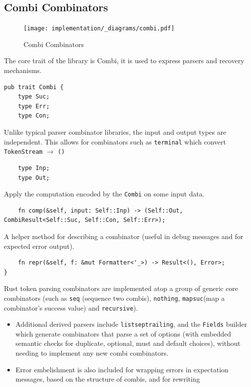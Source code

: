 \subsection{Combi Combinators}
\begin{figure}[h!]
    \centering
    \texttt{[image: implementation/\_diagrams/combi.pdf]}
    \caption{Combi Combinators}
\end{figure}
\noindent
The core trait of the library is Combi, it is used to express parsers and recovery mechanisms.
\begin{verbatim}
pub trait Combi {
    type Suc;
    type Err;
    type Con;
\end{verbatim}
Unlike typical parser combinator libraries, the input and output types are independent. This allows for combinators such as \texttt{terminal} which convert \texttt{TokenStream} $\to$ \texttt{()}
\begin{verbatim}
    type Inp;
    type Out;
\end{verbatim}
Apply the computation encoded by the \texttt{Combi} on some input data.
\begin{verbatim}
    fn comp(&self, input: Self::Inp) -> (Self::Out, CombiResult<Self::Suc, Self::Con, Self::Err>);
\end{verbatim}
A helper method for describing a combinator (useful in debug messages and for expected error output).
\begin{verbatim}
    fn repr(&self, f: &mut Formatter<'_>) -> Result<(), Error>;
}
\end{verbatim}
Rust token parsing combinators are implemented atop a group of generic core combinators (such as \texttt{seq} (sequence two combis), \texttt{nothing}, \texttt{mapsuc}(map a combinator's success value) and \texttt{recursive}).
\begin{itemize}
    \setlength\itemsep{0em}
    \item Additional derived parsers include \texttt{listseptrailing}, and the \texttt{Fields} builder which generate combinators that parse a set of options (with embedded semantic checks for duplicate, optional, must and default choices), without needing to implement any new combi combinators.
    \item Error embelishment is also included for wrapping errors in expectation messages, based on the structure of combis, and for rewriting
\end{itemize}
